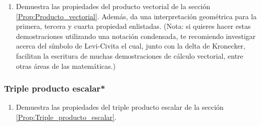 \begin{enumerate}
    \item Demuestra las propiedades del producto vectorial de la sección \ref{Prop:Producto_vectorial}. Además, da una interpretación geométrica para la primera, tercera y cuarta propiedad enlistadas. (Nota: si quieres hacer estas demostraciones utilizando una notación condensada, te recomiendo investigar acerca del símbolo de Levi-Civita el cual, junto con la delta de Kronecker, facilitan la escritura de muchas demostraciones de cálculo vectorial, entre otras áreas de las matemáticas.) 
\end{enumerate}

\subsubsection{Triple producto escalar*}

\begin{enumerate}
    \item Demuestra las propiedades del triple producto escalar de la sección \ref{Prop:Triple_producto_escalar}. 
\end{enumerate}{}

